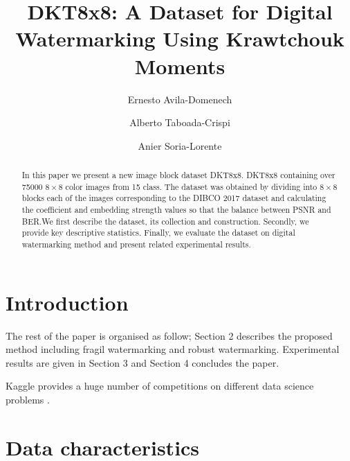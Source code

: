 \documentclass[runningheads]{llncs}
\begin{document}
%
\title{DKT8x8: A Dataset for Digital Watermarking Using Krawtchouk Moments}
%
%
\author{Ernesto Avila-Domenech \and
Alberto Taboada-Crispi \and
Anier Soria-Lorente}
%
%
%
\maketitle              %
%
\begin{abstract}
In this paper we present a new image block dataset DKT8x8. DKT8x8 containing over 75000 $8\times 8$ color images from 15 class. The dataset was obtained by dividing into $8\times 8$ blocks each of the images corresponding to the DIBCO 2017 dataset and calculating the coefficient and embedding strength values so that the balance between PSNR and BER.We first describe the dataset, its collection and construction. Secondly, we provide key descriptive statistics. Finally, we evaluate the dataset on digital watermarking method and present related experimental results.

\end{abstract}
%
%
%
\section{Introduction}
The rest of the paper is organised as follow; Section 2 describes the proposed method including fragil watermarking and robust watermarking. Experimental results are given in Section 3 and Section 4 concludes the paper.

Kaggle provides a huge number of competitions on different data science problems \cite{Subramanian2018}.

\section{Data characteristics}
\end{document}
